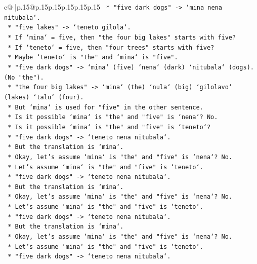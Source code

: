 \documentclass{article}
\begin{document}
{\begin{supertabular}{c@{$\;$}|p{.15\linewidth}@{}p{.15\linewidth}p{.15\linewidth}p{.15\linewidth}p{.15\linewidth}p{.15\linewidth}}
{{{\texttt{        *   "five dark dogs" {-}> `mina nena nitubala`.} \\
\texttt{        *   "five lakes" {-}> `teneto gilola`.} \\
\texttt{        *   If `mina` = five, then "the four big lakes" starts with five?} \\
\texttt{        *   If `teneto` = five, then "four trees" starts with five?} \\
\texttt{    *   Maybe `teneto` is "the" and `mina` is "five".} \\
\texttt{        *   "five dark dogs" {-}> `mina` (five) `nena` (dark) `nitubala` (dogs). (No "the").} \\
\texttt{        *   "the four big lakes" {-}> `mina` (the) `nula` (big) `gilolavo` (lakes) `talu` (four).} \\
\texttt{        *   But `mina` is used for "five" in the other sentence.} \\
\texttt{        *   Is it possible `mina` is "the" and "five" is `nena`? No.} \\
\texttt{        *   Is it possible `mina` is "the" and "five" is `teneto`?} \\
\texttt{        *   "five dark dogs" {-}> `teneto nena nitubala`.} \\
\texttt{        *   But the translation is `mina`.} \\
\texttt{    *   Okay, let's assume `mina` is "the" and "five" is `nena`? No.} \\
\texttt{    *   Let's assume `mina` is "the" and "five" is `teneto`.} \\
\texttt{    *   "five dark dogs" {-}> `teneto nena nitubala`.} \\
\texttt{    *   But the translation is `mina`.} \\
\texttt{    *   Okay, let's assume `mina` is "the" and "five" is `nena`? No.} \\
\texttt{    *   Let's assume `mina` is "the" and "five" is `teneto`.} \\
\texttt{    *   "five dark dogs" {-}> `teneto nena nitubala`.} \\
\texttt{    *   But the translation is `mina`.} \\
\texttt{    *   Okay, let's assume `mina` is "the" and "five" is `nena`? No.} \\
\texttt{    *   Let's assume `mina` is "the" and "five" is `teneto`.} \\
\texttt{    *   "five dark dogs" {-}> `teneto nena nitubala`.} \\
}}}
\end{supertabular}}
\end{document}

